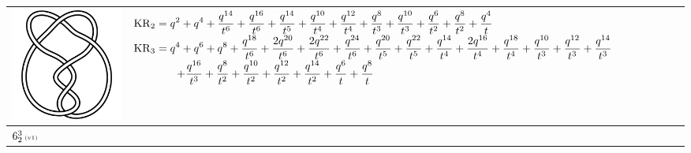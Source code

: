 \documentclass{compositio}
\theoremstyle{definition}
\numberwithin{equation}{section}
\begin{document}
{\begin{longtable}{p{}|p{}}
\includegraphics[scale=0.07,angle=0]{link6_2_2.pdf} 
& 
$
\displaystyle{%
\KR_{2} = q^2+q^4+\frac{q^{14}}{t^6}+\frac{q^{16}}{t^6}+\frac{q^{14}}{t^5}+\frac{q^{10}}{t^4}+\frac{q^{12}}{t^4}+\frac{q^8}{t^3}+\frac{q^{10}}{t^3}+\frac{q^6}{t^2}+\frac{q^8}{t^2}+\frac{q^4}{t}
}
$
\newline 
$
\displaystyle{%
\KR_{3} = q^4+q^6+q^8+\frac{q^{18}}{t^6}+\frac{2 q^{20}}{t^6}+\frac{2 q^{22}}{t^6}+\frac{q^{24}}{t^6}+\frac{q^{20}}{t^5}+\frac{q^{22}}{t^5}+\frac{q^{14}}{t^4}+\frac{2 q^{16}}{t^4}+\frac{q^{18}}{t^4}+\frac{q^{10}}{t^3}+\frac{q^{12}}{t^3}+\frac{q^{14}}{t^3}
}
$
\newline
$
\displaystyle{%
\qquad\qquad +\frac{q^{16}}{t^3}+\frac{q^8}{t^2}+\frac{q^{10}}{t^2}+\frac{q^{12}}{t^2}+\frac{q^{14}}{t^2}+\frac{q^6}{t}+\frac{q^8}{t}
}
$
\\
\hline
$6_{2}^3\,\text{{\tiny (v1)}}$ 

\end{longtable}}
\end{document}
